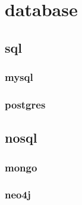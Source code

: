 \chapter{database}
\section{sql}
\subsection{mysql}
\subsection{postgres}
\section{nosql}
\subsection{mongo}
\subsection{neo4j}
